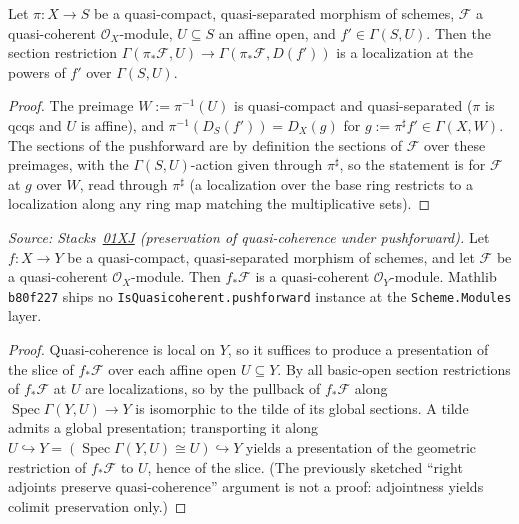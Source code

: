 \begin{lemma}
  \label{lem:pushforward_section_localization}
  \leanok
  Let $\pi : X \to S$ be a quasi-compact, quasi-separated morphism of
  schemes, $\mathcal{F}$ a quasi-coherent $\mathcal{O}_X$-module,
  $U \subseteq S$ an affine open, and $f' \in \Gamma(S, U)$. Then the section
  restriction
  $\Gamma(\pi_* \mathcal{F}, U) \to \Gamma(\pi_* \mathcal{F}, D(f'))$ is a
  localization at the powers of $f'$ over $\Gamma(S, U)$.
\end{lemma}
\begin{proof}
  \leanok
  The preimage $W := \pi^{-1}(U)$ is quasi-compact and quasi-separated
  ($\pi$ is qcqs and $U$ is affine), and
  $\pi^{-1}(D_S(f')) = D_X(g)$ for $g := \pi^\sharp f' \in \Gamma(X, W)$. The
  sections of the pushforward are by definition the sections of
  $\mathcal{F}$ over these preimages, with the $\Gamma(S, U)$-action given
  through $\pi^\sharp$, so the statement is
   for $\mathcal{F}$ at $g$ over $W$,
  read through $\pi^\sharp$ (a localization over the base ring restricts to a
  localization along any ring map matching the multiplicative sets).
\end{proof}

\begin{lemma}
  \label{lem:pushforward_isQuasicoherent}
  \leanok
  \textit{Source: Stacks~\href{https://stacks.math.columbia.edu/tag/01XJ}{01XJ}
  (preservation of quasi-coherence under pushforward).}
  Let \(f : X \to Y\) be a quasi-compact, quasi-separated morphism of
  schemes, and let \(\mathcal{F}\) be a quasi-coherent
  \(\mathcal{O}_X\)-module. Then \(f_* \mathcal{F}\) is a quasi-coherent
  \(\mathcal{O}_Y\)-module. Mathlib \texttt{b80f227} ships no
  \texttt{IsQuasicoherent.pushforward} instance at the
  \texttt{Scheme.Modules} layer.
\end{lemma}
\begin{proof}
  \leanok
  Quasi-coherence is local on $Y$, so it suffices to produce a presentation
  of the slice of $f_* \mathcal{F}$ over each affine open $U \subseteq Y$.
  By  all basic-open section
  restrictions of $f_* \mathcal{F}$ at $U$ are localizations, so by
   the pullback of
  $f_* \mathcal{F}$ along $\operatorname{Spec} \Gamma(Y, U) \to Y$ is
  isomorphic to the tilde of its global sections. A tilde admits a global
  presentation; transporting it along
  $U \hookrightarrow Y = (\operatorname{Spec}\Gamma(Y,U) \cong U)
  \hookrightarrow Y$ yields a presentation of the geometric restriction of
  $f_* \mathcal{F}$ to $U$, hence of the slice. (The previously sketched
  ``right adjoints preserve quasi-coherence'' argument is not a proof:
  adjointness yields colimit preservation only.)
\end{proof}

